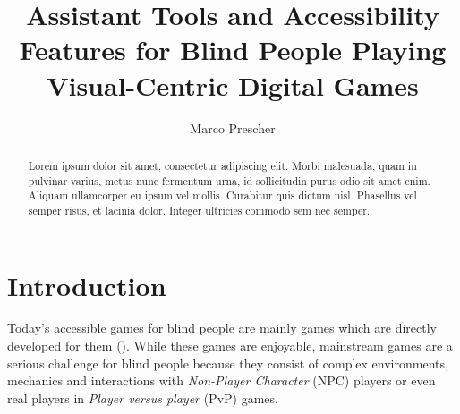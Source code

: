 \documentclass[sigconf,natbib=false,10pt]{acmart}
\begin{document}
	
	\title{Assistant Tools and Accessibility Features for Blind People Playing Visual-Centric Digital Games}
	
	\author{Marco Prescher}
	
	\renewcommand{\shortauthors}{Marco Prescher}
	
	\begin{abstract}
		Lorem ipsum dolor sit amet, consectetur adipiscing elit. Morbi
		malesuada, quam in pulvinar varius, metus nunc fermentum urna, id
		sollicitudin purus odio sit amet enim. Aliquam ullamcorper eu ipsum
		vel mollis. Curabitur quis dictum nisl. Phasellus vel semper risus, et
		lacinia dolor. Integer ultricies commodo sem nec semper.
	\end{abstract}
	
	
	
	
	\maketitle
	
	\section{Introduction}
	Today's accessible games for blind people are mainly games which are directly developed for them (\textcite{goncalves_my_2023}).
	While these games are enjoyable, mainstream games are a serious challenge for blind people because they consist of complex environments, mechanics and interactions with \emph{Non-Player Character} (NPC) players or even real players in \emph{Player versus player} (PvP) games.
	
\end{document}
